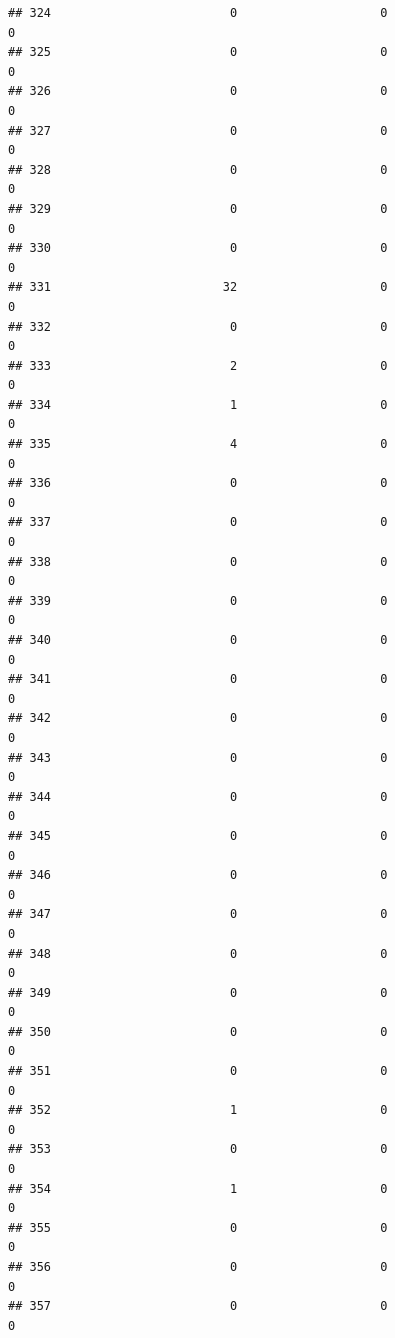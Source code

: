 \documentclass[
]{article}
\begin{document}
\begin{verbatim}
## 324                         0                    0                      0
## 325                         0                    0                      0
## 326                         0                    0                      0
## 327                         0                    0                      0
## 328                         0                    0                      0
## 329                         0                    0                      0
## 330                         0                    0                      0
## 331                        32                    0                      0
## 332                         0                    0                      0
## 333                         2                    0                      0
## 334                         1                    0                      0
## 335                         4                    0                      0
## 336                         0                    0                      0
## 337                         0                    0                      0
## 338                         0                    0                      0
## 339                         0                    0                      0
## 340                         0                    0                      0
## 341                         0                    0                      0
## 342                         0                    0                      0
## 343                         0                    0                      0
## 344                         0                    0                      0
## 345                         0                    0                      0
## 346                         0                    0                      0
## 347                         0                    0                      0
## 348                         0                    0                      0
## 349                         0                    0                      0
## 350                         0                    0                      0
## 351                         0                    0                      0
## 352                         1                    0                      0
## 353                         0                    0                      0
## 354                         1                    0                      0
## 355                         0                    0                      0
## 356                         0                    0                      0
## 357                         0                    0                      0

\end{verbatim}
\end{document}
